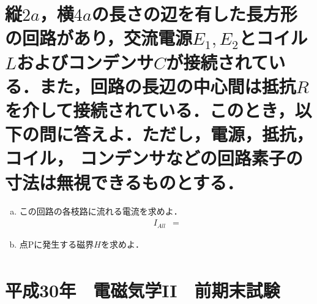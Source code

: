 \documentclass[dvipdfmx]{ujarticle}
\begin{document}
\section{縦$2a$，横$4a$の長さの辺を有した長方形の回路があり，交流電源$E_{1}, E_{2}$とコイル$L$およびコンデンサ$C$が接続されている．また，回路の長辺の中心間は抵抗$R$を介して接続されている．このとき，以下の問に答えよ．ただし，電源，抵抗，コイル， コンデンサなどの回路素子の寸法は無視できるものとする．}
\begin{enumerate}[(a)]
	\item この回路の各枝路に流れる電流を求めよ．
	\begin{align*}
		I_{All}&=
	\end{align*}
	\item 点Pに発生する磁界$H$を求めよ．
	\begin{align*}
	\end{align*}
\end{enumerate}

\clearpage
\setcounter{section}{0}
\section*{平成30年　電磁気学II　前期末試験}
\end{document}
